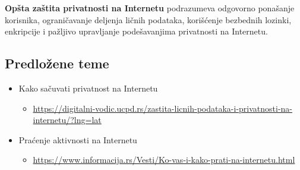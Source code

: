 \documentclass[a4paper, 12pt]{article}
\begin{document}
\textbf{Opšta zaštita privatnosti na Internetu} podrazumeva odgovorno ponašanje korisnika,
ograničavanje deljenja ličnih podataka, korišćenje bezbednih lozinki, enkripcije i
pažljivo upravljanje podešavanjima privatnosti na Internetu.


\subsection{Predložene teme}

\begin{itemize}
    \item Kako sačuvati privatnost na Internetu
    \begin{itemize}
        \item \url{https://digitalni-vodic.ucpd.rs/zastita-licnih-podataka-i-privatnosti-na-internetu/?lng=lat}
    \end{itemize}
    \item Praćenje aktivnosti na Internetu
    \begin{itemize}
        \item \url{https://www.informacija.rs/Vesti/Ko-vas-i-kako-prati-na-internetu.html}
    \end{itemize}
    
\end{itemize}
\end{document}
